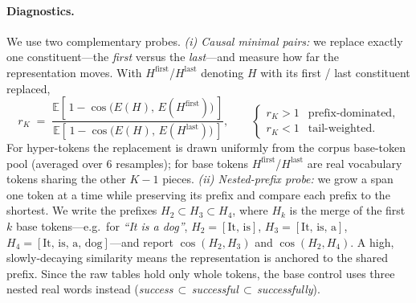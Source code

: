 \paragraph{Diagnostics.}
We use two complementary probes. \emph{(i) Causal minimal pairs:} we replace
exactly one constituent---the \emph{first} versus the \emph{last}---and measure
how far the representation moves. With $H^{\text{first}}$/$H^{\text{last}}$
denoting $H$ with its first / last constituent replaced,
%
\begin{equation}
r_K \;=\;
\frac{\mathbb{E}\!\left[\,1-\cos\!\big(E(H),\,E(H^{\text{first}})\big)\,\right]}
     {\mathbb{E}\!\left[\,1-\cos\!\big(E(H),\,E(H^{\text{last}})\big)\,\right]},
\qquad
\begin{cases}
r_K > 1 & \text{prefix-dominated,}\\
r_K < 1 & \text{tail-weighted.}
\end{cases}
\end{equation}
%
For hyper-tokens the replacement is drawn uniformly from the corpus base-token
pool (averaged over $6$ resamples); for base tokens $H^{\text{first}}$/$H^{\text{last}}$
are real vocabulary tokens sharing the other $K\!-\!1$ pieces. \emph{(ii)
Nested-prefix probe:} we grow a span one token at a time while preserving its
prefix and compare each prefix to the shortest. We write the prefixes
$H_2\!\subset\!H_3\!\subset\!H_4$, where $H_k$ is the merge of the first $k$ base
tokens---e.g.\ for \textit{``It is a dog''}, $H_2{=}[\text{It, is}]$,
$H_3{=}[\text{It, is, a}]$, $H_4{=}[\text{It, is, a, dog}]$---and report
$\cos(H_2,H_3)$ and $\cos(H_2,H_4)$. A high, slowly-decaying similarity means the
representation is anchored to the shared prefix. Since the raw tables hold only
whole tokens, the base control uses three nested real words instead
(\textit{success}\,$\subset$\,\textit{successful}\,$\subset$\,\textit{successfully}).

